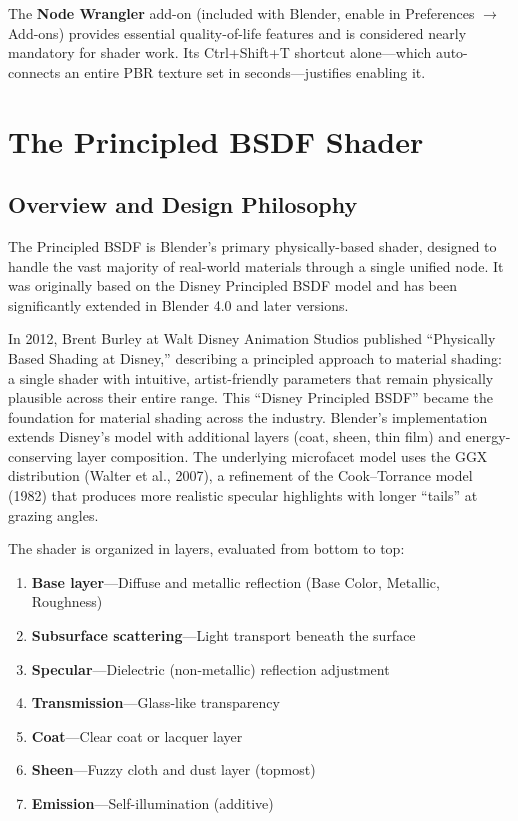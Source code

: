 \begin{tipbox}
The \textbf{Node Wrangler} add-on (included with Blender, enable in
Preferences $\rightarrow$ Add-ons) provides essential quality-of-life
features and is considered nearly mandatory for shader work. Its
Ctrl+Shift+T shortcut alone---which auto-connects an entire PBR
texture set in seconds---justifies enabling it.
\end{tipbox}


\section{The Principled BSDF Shader}
\label{sec:shading:principled}

\subsection{Overview and Design Philosophy}

The Principled BSDF is Blender's primary physically-based shader,
designed to handle the vast majority of real-world materials through
a single unified node. It was originally based on the Disney
Principled BSDF model and has been significantly extended in Blender
4.0 and later versions.

\begin{historynote}
In 2012, Brent Burley at Walt Disney Animation Studios published
``Physically Based Shading at Disney,'' describing a principled
approach to material shading: a single shader with intuitive,
artist-friendly parameters that remain physically plausible across
their entire range. This ``Disney Principled BSDF'' became the
foundation for material shading across the industry. Blender's
implementation extends Disney's model with additional layers (coat,
sheen, thin film) and energy-conserving layer composition. The
underlying microfacet model uses the GGX distribution (Walter et
al., 2007), a refinement of the Cook--Torrance model (1982) that
produces more realistic specular highlights with longer ``tails''
at grazing angles.
\end{historynote}

The shader is organized in layers, evaluated from bottom to top:
\begin{enumerate}[leftmargin=2em]
  \item \textbf{Base layer}---Diffuse and metallic reflection
        (Base Color, Metallic, Roughness)
  \item \textbf{Subsurface scattering}---Light transport beneath
        the surface
  \item \textbf{Specular}---Dielectric (non-metallic) reflection
        adjustment
  \item \textbf{Transmission}---Glass-like transparency
  \item \textbf{Coat}---Clear coat or lacquer layer
  \item \textbf{Sheen}---Fuzzy cloth and dust layer (topmost)
  \item \textbf{Emission}---Self-illumination (additive)
\end{enumerate}

